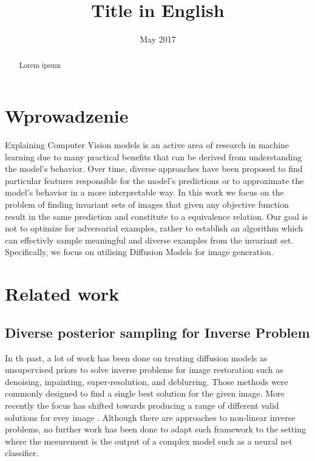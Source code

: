 \documentclass[licencjacka,en]{pracamgr}
\title{Title in English}
\date{May 2017}
\begin{document}
\maketitle

\begin{abstract}
  Lorem ipsum 
\end{abstract}

\tableofcontents

\chapter*{Wprowadzenie}

Explaining Computer Vision models is an active area of research in machine learning due to many practical benefits that can be derived from understanding the model's behavior. 
Over time, diverse approaches have been proposed to find particular features responsible for the model's predictions or to approximate the model's behavior in a more interpretable way.
In this work we focus on the problem of finding invariant sets of images that given any objective function result in the same prediction and constitute to a equivalence relation.
Our goal is not to optimize for adversarial examples, rather to establish an algorithm which can effectivly sample meaningful and diverse examples from the invariant set.
Specifically, we focus on utilising Diffusion Models for image generation.

\chapter{Related work}\label{r:related_work}

\section{Diverse posterior sampling for Inverse Problem}
In th past, a lot of work has been done on treating diffusion models as unsupervised priors to solve inverse problems for image restoration such as denoising, inpainting, super-resolution, and deblurring.
Those methods were commonly designed to find a single best solution for the given image.
More recently the focus has shifted towards producing a range of different valid solutions for evey image \cite{cohen2024posteriorsamplingmeaningfuldiversity}. 
Although there are approaches to non-linear inverse problems, no further work has been done to adapt such framework to the setting where the mesurement is the output of a complex model such as a neural net classifier. 
\end{document}
